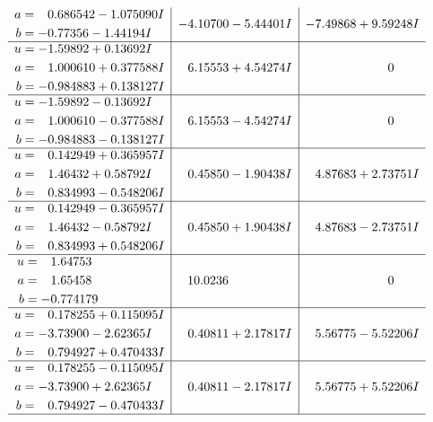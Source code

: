 \documentclass[1p]{elsarticle_modified}
\theoremstyle{definition}
\begin{document}
$$\begin{array}{c|c|c}
\begin{aligned}
a &= \phantom{-}0.686542 - 1.075090 I \\
b &= -0.77356 - 1.44194 I\end{aligned}
 & -4.10700 - 5.44401 I & -7.49868 + 9.59248 I \\ \hline\begin{aligned}
u &= -1.59892 + 0.13692 I \\
a &= \phantom{-}1.000610 + 0.377588 I \\
b &= -0.984883 + 0.138127 I\end{aligned}
 & \phantom{-}6.15553 + 4.54274 I & \phantom{-0.000000 } 0 \\ \hline\begin{aligned}
u &= -1.59892 - 0.13692 I \\
a &= \phantom{-}1.000610 - 0.377588 I \\
b &= -0.984883 - 0.138127 I\end{aligned}
 & \phantom{-}6.15553 - 4.54274 I & \phantom{-0.000000 } 0 \\ \hline\begin{aligned}
u &= \phantom{-}0.142949 + 0.365957 I \\
a &= \phantom{-}1.46432 + 0.58792 I \\
b &= \phantom{-}0.834993 - 0.548206 I\end{aligned}
 & \phantom{-}0.45850 - 1.90438 I & \phantom{-}4.87683 + 2.73751 I \\ \hline\begin{aligned}
u &= \phantom{-}0.142949 - 0.365957 I \\
a &= \phantom{-}1.46432 - 0.58792 I \\
b &= \phantom{-}0.834993 + 0.548206 I\end{aligned}
 & \phantom{-}0.45850 + 1.90438 I & \phantom{-}4.87683 - 2.73751 I \\ \hline\begin{aligned}
u &= \phantom{-}1.64753\phantom{ +0.000000I} \\
a &= \phantom{-}1.65458\phantom{ +0.000000I} \\
b &= -0.774179\phantom{ +0.000000I}\end{aligned}
 & \phantom{-}10.0236\phantom{ +0.000000I} & \phantom{-0.000000 } 0 \\ \hline\begin{aligned}
u &= \phantom{-}0.178255 + 0.115095 I \\
a &= -3.73900 - 2.62365 I \\
b &= \phantom{-}0.794927 + 0.470433 I\end{aligned}
 & \phantom{-}0.40811 + 2.17817 I & \phantom{-}5.56775 - 5.52206 I \\ \hline\begin{aligned}
u &= \phantom{-}0.178255 - 0.115095 I \\
a &= -3.73900 + 2.62365 I \\
b &= \phantom{-}0.794927 - 0.470433 I\end{aligned}
 & \phantom{-}0.40811 - 2.17817 I & \phantom{-}5.56775 + 5.52206 I\\
 \hline 
 \end{array}$$\newpage\newpage\renewcommand{\arraystretch}{1}
\end{document}
